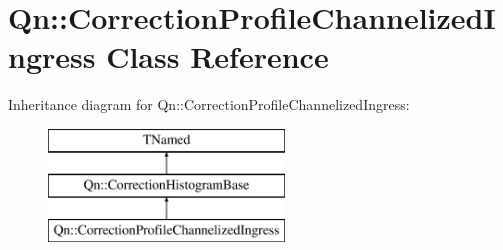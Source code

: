 \hypertarget{classQn_1_1CorrectionProfileChannelizedIngress}{}\section{Qn\+:\+:Correction\+Profile\+Channelized\+Ingress Class Reference}
\label{classQn_1_1CorrectionProfileChannelizedIngress}
Inheritance diagram for Qn\+:\+:Correction\+Profile\+Channelized\+Ingress\+:\begin{figure}[H]
\begin{center}
\leavevmode
\includegraphics[height=3.000000cm]{classQn_1_1CorrectionProfileChannelizedIngress}
\end{center}
\end{figure}

